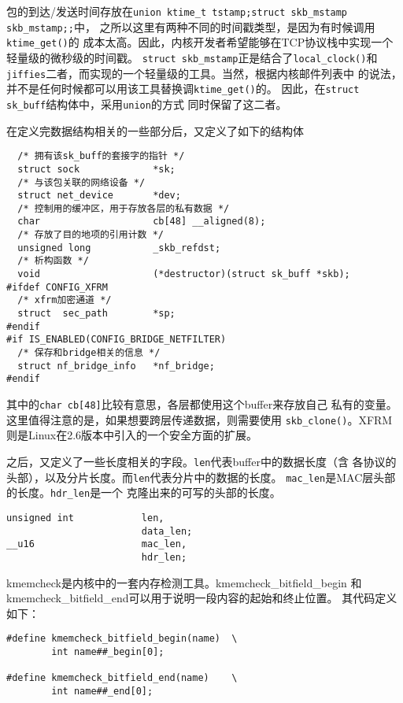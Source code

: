 包的到达/发送时间存放在\texttt{union {ktime_t tstamp;struct skb_mstamp skb_mstamp;};}中，
之所以这里有两种不同的时间戳类型，是因为有时候调用\texttt{ktime_get()}的
成本太高。因此，内核开发者希望能够在TCP协议栈中实现一个轻量级的微秒级的时间戳。
\texttt{struct skb_mstamp}正是结合了\texttt{local_clock()}和
\texttt{jiffies}二者，而实现的一个轻量级的工具。当然，根据内核邮件列表中
的说法，并不是任何时候都可以用该工具替换调\texttt{ktime_get()}的。
因此，在\texttt{struct sk_buff}结构体中，采用\texttt{union}的方式
同时保留了这二者。

在定义完数据结构相关的一些部分后，又定义了如下的结构体
\begin{verbatim}
  /* 拥有该sk_buff的套接字的指针 */
  struct sock             *sk;
  /* 与该包关联的网络设备 */
  struct net_device       *dev;
  /* 控制用的缓冲区，用于存放各层的私有数据 */
  char                    cb[48] __aligned(8);
  /* 存放了目的地项的引用计数 */
  unsigned long           _skb_refdst;
  /* 析构函数 */
  void                    (*destructor)(struct sk_buff *skb);
#ifdef CONFIG_XFRM
  /* xfrm加密通道 */
  struct  sec_path        *sp;
#endif
#if IS_ENABLED(CONFIG_BRIDGE_NETFILTER)
  /* 保存和bridge相关的信息 */
  struct nf_bridge_info   *nf_bridge;
#endif
\end{verbatim}

其中的\texttt{char cb[48]}比较有意思，各层都使用这个buffer来存放自己
私有的变量。这里值得注意的是，如果想要跨层传递数据，则需要使用
\texttt{skb_clone()}。XFRM则是Linux在2.6版本中引入的一个安全方面的扩展。

之后，又定义了一些长度相关的字段。\texttt{len}代表buffer中的数据长度（含
各协议的头部），以及分片长度。而\texttt{len}代表分片中的数据的长度。
\texttt{mac_len}是MAC层头部的长度。\texttt{hdr_len}是一个
克隆出来的可写的头部的长度。
\begin{verbatim}
unsigned int            len,
                        data_len;
__u16                   mac_len,
                        hdr_len;
\end{verbatim}

kmemcheck是内核中的一套内存检测工具。kmemcheck\_bitfield\_begin
和kmemcheck\_bitfield\_end可以用于说明一段内容的起始和终止位置。
其代码定义如下：
\begin{verbatim}
#define kmemcheck_bitfield_begin(name)  \
        int name##_begin[0];

#define kmemcheck_bitfield_end(name)    \
        int name##_end[0];
\end{verbatim}

